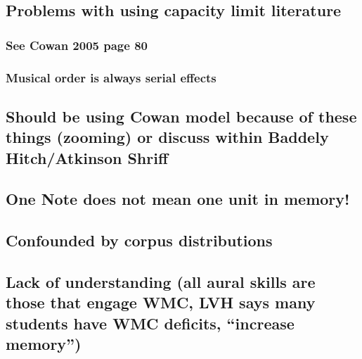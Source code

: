 \documentclass[]{book}
\theoremstyle{definition}
\theoremstyle{definition}
\theoremstyle{definition}
\theoremstyle{remark}
\begin{document}
\hypertarget{problems-with-using-capacity-limit-literature}{%
\subsection{Problems with using capacity limit
literature}\label{problems-with-using-capacity-limit-literature}}

\hypertarget{see-cowan-2005-page-80}{%
\subsubsection{See Cowan 2005 page 80}\label{see-cowan-2005-page-80}}

\hypertarget{musical-order-is-always-serial-effects}{%
\subsubsection{Musical order is always serial
effects}\label{musical-order-is-always-serial-effects}}

\hypertarget{should-be-using-cowan-model-because-of-these-things-zooming-or-discuss-within-baddely-hitchatkinson-shriff}{%
\subsection{Should be using Cowan model because of these things
(zooming) or discuss within Baddely Hitch/Atkinson
Shriff}\label{should-be-using-cowan-model-because-of-these-things-zooming-or-discuss-within-baddely-hitchatkinson-shriff}}

\hypertarget{one-note-does-not-mean-one-unit-in-memory}{%
\subsection{One Note does not mean one unit in
memory!}\label{one-note-does-not-mean-one-unit-in-memory}}

\hypertarget{confounded-by-corpus-distributions}{%
\subsection{Confounded by corpus
distributions}\label{confounded-by-corpus-distributions}}

\hypertarget{lack-of-understanding-all-aural-skills-are-those-that-engage-wmc-lvh-says-many-students-have-wmc-deficits-increase-memory}{%
\subsection{Lack of understanding (all aural skills are those that
engage WMC, LVH says many students have WMC deficits, ``increase
memory'')}\label{lack-of-understanding-all-aural-skills-are-those-that-engage-wmc-lvh-says-many-students-have-wmc-deficits-increase-memory}}
\end{document}
